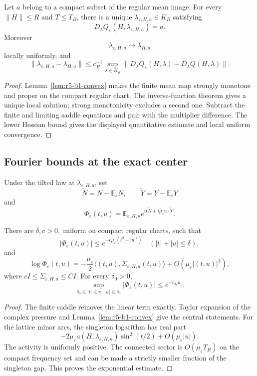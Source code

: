 \begin{theorem}
\label{thm:r5-b1-saddle}
Let \(a\) belong to a compact subset of the regular mean image.  For every
\(\|H\|\le R\) and \(T\le T_R\), there is a unique
\(\lambda_{\varepsilon,H,a}\in K_R\) satisfying
\[
 D_\lambda Q_\varepsilon(H,\lambda_{\varepsilon,H,a})=a.
\]
Moreover
\[
 \lambda_{\varepsilon,H,a}\longrightarrow\lambda_{H,a}
\]
locally uniformly, and
\[
 \|\lambda_{\varepsilon,H,a}-\lambda_{H,a}\|
 \le c_R^{-1}
 \sup_{\lambda\in K_R}
 \|D_\lambda Q_\varepsilon(H,\lambda)-D_\lambda Q(H,\lambda)\|.
\]
\end{theorem}

\begin{proof}
Lemma~\ref{lem:r5-b1-convex} makes the finite mean map strongly monotone and
proper on the compact regular chart.  The inverse-function theorem gives a
unique local solution; strong monotonicity excludes a second one.  Subtract
the finite and limiting saddle equations and pair with the multiplier
difference.  The lower Hessian bound gives the displayed quantitative
estimate and local uniform convergence.
\end{proof}

\subsection{Fourier bounds at the exact center}

Under the tilted law at \(\lambda_{\varepsilon,H,a}\), set
\[
 \widetilde N=N-\mathbb E_\varepsilon N,\qquad
 \widetilde Y=Y-\mathbb E_\varepsilon Y
\]
and
\[
 \Phi_\varepsilon(t,u)
 =\mathbb E_{\varepsilon,H,a}
   e^{it\widetilde N+i\mu_\varepsilon u\cdot\widetilde Y}.
\]

\begin{lemma}
\label{lem:r5-b1-fourier}
There are \(\delta,c>0\), uniform on compact regular charts, such that
\[
 |\Phi_\varepsilon(t,u)|
 \le e^{-c\mu_\varepsilon(t^2+|u|^2)}
 \quad (|t|+|u|\le\delta),
\]
and
\[
 \log\Phi_\varepsilon(t,u)
 =-\frac{\mu_\varepsilon}{2}
  \langle(t,u),\Sigma_{\varepsilon,H,a}(t,u)\rangle
 +O(\mu_\varepsilon|(t,u)|^3),
\]
where \(cI\le\Sigma_{\varepsilon,H,a}\le CI\).  For every
\(\delta_0>0\),
\[
 \sup_{\delta_0\le|t|\le\pi,\ |u|\le\delta_0}
 |\Phi_\varepsilon(t,u)|
 \le e^{-c_{\delta_0}\mu_\varepsilon}.
\]
\end{lemma}

\begin{proof}
The finite saddle removes the linear term exactly.  Taylor expansion of the
complex pressure and Lemma~\ref{lem:r5-b1-convex} give the central statements.
For the lattice minor arcs, the singleton logarithm has real part
\[
 -2\mu_\varepsilon a(H,\lambda_{\varepsilon,H,a})
   \sin^2(t/2)+O(\mu_\varepsilon|u|).
\]
The activity is uniformly positive.  The connected sector is
\(O(\mu_\varepsilon T_R)\) on the compact frequency set and can be made a
strictly smaller fraction of the singleton gap.  This proves the
exponential estimate.
\end{proof}

